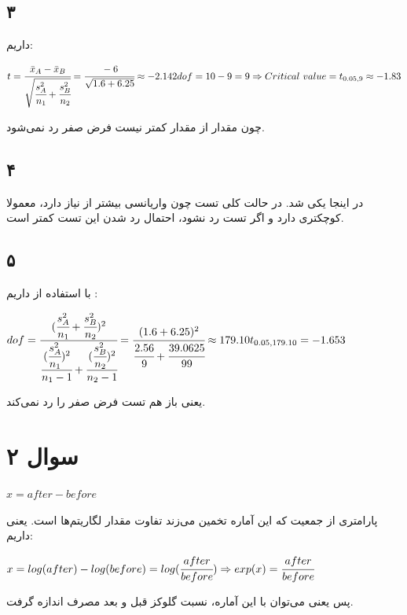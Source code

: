 \documentclass[12pt]{article}
\begin{document}
\subsection{۳}
داریم:
\begin{latin}
	$
	t = \cfrac{\bar{x}_A - \bar{x}_B}{\sqrt{\cfrac{s_A^2}{n_1} + \cfrac{s_B^2}{n_2}}}
	= \cfrac{-6}{\sqrt{1.6 + 6.25}} \approx -2.142
	\\\\
dof = 10 - 9 = 9 \Rightarrow Critical\ value = t_{0.05, 9} \approx -1.83
	$
\end{latin}
چون مقدار 
از مقدار 
کمتر نیست فرض صفر رد نمی‌شود.
\subsection{۴}
در اینجا یکی شد. در حالت کلی تست  چون واریانسی بیشتر از 
نیاز دارد،‌ معمولا 
کوچکتری دارد و اگر تست 
رد نشود، احتمال رد شدن این تست کمتر است.
\subsection{۵}
با استفاده از 
داریم
\cite{welchs_t_test}
:
\begin{latin}
	$
		dof = \cfrac{(\cfrac{s_A^2}{n_1} + \cfrac{s_B^2}{n_2})^2}{\cfrac{(\cfrac{s_A^2}{n_1})^2}{n_1 - 1} + \cfrac{(\cfrac{s_B^2}{n_2})^2}{n_2 - 1}}
		= \cfrac{(1.6 + 6.25)^2}{\cfrac{2.56}{9} + \cfrac{39.0625}{99}}
		\approx 179.10
		t_{0.05, 179.10} = -1.653
	$
\end{latin}
یعنی باز هم تست فرض صفر را رد نمی‌کند.
	\section{سوال ۲}
\begin{latin}
	$
	x = after - before
	$
\end{latin}	
پارامتری از جمعیت که این آماره تخمین می‌زند تفاوت مقدار لگاریتم‌ها است. یعنی داریم:
\begin{latin}
	$
	x = log(after) - log(before) = log (\cfrac{after}{before}) \Rightarrow exp(x) = \cfrac{after}{before} 
	$
\end{latin}
پس یعنی می‌توان با این آماره، نسبت گلوکز قبل و بعد مصرف اندازه گرفت.
\end{document}
